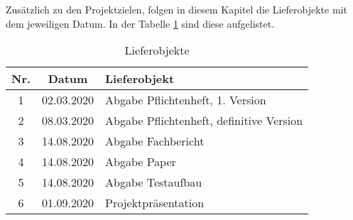 Zusätzlich zu den Projektzielen, folgen in diesem Kapitel die Lieferobjekte  mit dem jeweiligen Datum. In der Tabelle \ref{tbl:Lieferobjekte} sind diese  aufgelistet.  


\begin{table}[H]
     \centering
\begin{tabular}{|c|c|l|}\hline
   \textbf{Nr.} & \textbf{Datum} & \textbf{Lieferobjekt} \\ \hline
   
   1 & 02.03.2020 & Abgabe Pflichtenheft, 1. Version\\ \hline
   2 & 08.03.2020 & Abgabe Pflichtenheft, definitive Version\\ \hline
   3 & 14.08.2020 & Abgabe Fachbericht \\ \hline
   4 & 14.08.2020 & Abgabe Paper \\ \hline
   5 & 14.08.2020 & Abgabe Testaufbau \\ \hline
   6 & 01.09.2020 & Projektpräsentation \\ \hline
   
   
   
 \end{tabular}
     \caption{Lieferobjekte}
     \label{tbl:Lieferobjekte}
\end{table}